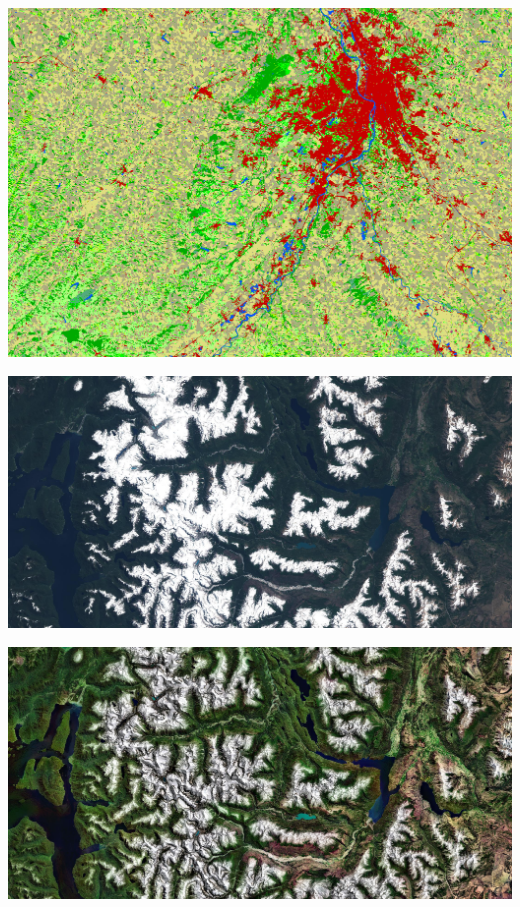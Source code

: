 \documentclass[8pt]{beamer}
\begin{document}
\vspace*{-6.5mm}
\begin{frame}[plain]
\hspace*{-11mm}
    \includegraphics[keepaspectratio,height=1.1\paperheight]{../../Courses/org/WorkshopGuide/Images/final_classification.png}
\end{frame}

\vspace*{-6.5mm}
\begin{frame}[plain]
\hspace*{-11mm}
    \includegraphics[keepaspectratio,height=1.1\paperheight]{images/imag4tci.jpg}
\end{frame}

\vspace*{-6.5mm}
\begin{frame}[plain]
\hspace*{-11mm}
\includegraphics[keepaspectratio,height=1.1\paperheight]{images/image4_glob_each_lim20_8b_sub.jpg}
\end{frame}
\end{document}
